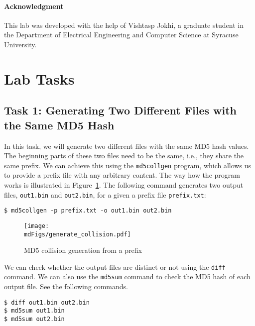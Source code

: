 \paragraph{Acknowledgment} This lab was developed with the help of Vishtasp
Jokhi, a graduate student in the Department of Electrical Engineering and
Computer Science at Syracuse University.



\section{Lab Tasks}


\subsection{Task 1: Generating Two Different Files with the Same MD5 Hash}


In this task, we will generate two different files with the same MD5 hash values. 
The beginning parts of these two files need to be the same, i.e., they share the same prefix.
We can achieve this using the \texttt{md5collgen} program, which allows us 
to provide a prefix file with any arbitrary content. 
The way how the program works is illustrated in Figure~\ref{md5:fig:md5collgen}.
The following command generates two output files,
\texttt{out1.bin}  and \texttt{out2.bin}, for a given a prefix file \texttt{prefix.txt}: 

\begin{lstlisting}
$ md5collgen -p prefix.txt -o out1.bin out2.bin
\end{lstlisting}


\begin{figure}[htb]
	\centering
	\texttt{[image: \\mdFigs/generate\_collision.pdf]}
	\caption{MD5 collision generation from a prefix}
	\label{md5:fig:md5collgen}
\end{figure}
 

We can check whether the output files are distinct or not using the \texttt{diff} command.
We can also use the \texttt{md5sum} command to check the MD5 hash 
of each output file. See the following commands.

\begin{lstlisting}
$ diff out1.bin out2.bin
$ md5sum out1.bin
$ md5sum out2.bin
\end{lstlisting}
 
